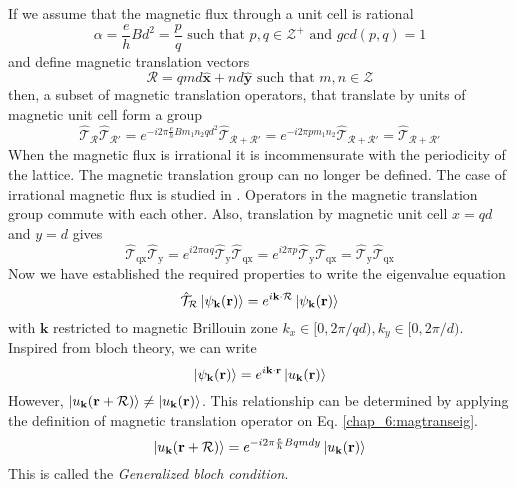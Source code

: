 If we assume that the magnetic flux through a unit cell is rational
\begin{equation}
 \alpha = \frac{e}{h}Bd^2 = \frac{p}{q} \text{ such that } p,q \in \mathcal{Z}^{+} \text{ and } gcd(p, q) = 1
\end{equation} and define magnetic translation vectors
\begin{equation}
 \mathcal{R} = qmd \hat{\mathbf{x}} + nd \hat{\mathbf{y}} \text{ such that } m,n \in \mathcal{Z}
\end{equation} then, a subset of magnetic translation operators, that translate by units of magnetic unit cell form a group
\begin{equation}
 \hat{\mathcal{T}}_{\mathcal{R}}\hat{\mathcal{T}}_{\mathcal{R}'} = e^{-i2\pi\frac{e}{h}Bm_{1}n_{2}qd^2}\hat{\mathcal{T}}_{\mathcal{R} + \mathcal{R}'} = e^{-i2\pi p m_{1}n_{2}}\hat{\mathcal{T}}_{\mathcal{R} + \mathcal{R}'} = \hat{\mathcal{T}}_{\mathcal{R} + \mathcal{R}'}
\end{equation} When the magnetic flux is irrational it is incommensurate with the periodicity of the lattice. The magnetic translation group can no longer be defined. The case of irrational magnetic flux is studied in \parencite{obermair1976bloch}. Operators in the magnetic translation group commute with each other. Also,
translation by magnetic unit cell $x=qd$ and $y=d$ gives 
\begin{equation}
 \hat{\mathcal{T}}_{\mathrm{qx}}\hat{\mathcal{T}}_{\mathrm{y}} = e^{i2\pi\alpha q}\hat{\mathcal{T}}_{\mathrm{y}}\hat{\mathcal{T}}_{\mathrm{qx}} = e^{i2\pi p}\hat{\mathcal{T}}_{\mathrm{y}}\hat{\mathcal{T}}_{\mathrm{qx}}=\hat{\mathcal{T}}_{\mathrm{y}}\hat{\mathcal{T}}_{\mathrm{qx}}
\end{equation}
Now we have established the required properties to write the eigenvalue equation
\begin{equation}
 \label{chap_6:magtranseig}\hat{\mathcal{T}}_{\mathcal{R}}\ket{\psi_{\mathbf{k}}(\mathbf{r})} = e^{i\mathbf{k}\cdot\mathcal{R}}\ket{\psi_{\mathbf{k}}(\mathbf{r})}
\end{equation} with $\mathbf{k}$ restricted to magnetic Brillouin zone $k_{x} \in [0, 2\pi/qd), k_{y} \in [0, 2\pi/d)$. Inspired from bloch theory,
we can write
\begin{equation}
 \ket{\psi_{\mathbf{k}}(\mathbf{r})} = e^{i\mathbf{k}\cdot\mathbf{r}}\ket{u_{\mathbf{k}}(\mathbf{r})}
\end{equation} However, $\ket{u_{\mathbf{k}}(\mathbf{r}+\mathcal{R})} \neq \ket{u_{\mathbf{k}}(\mathbf{r})}$. This relationship can be determined by applying the definition
of magnetic translation operator on Eq. \eqref{chap_6:magtranseig}.
\begin{equation}
 \ket{u_{\mathbf{k}}(\mathbf{r} + \mathcal{R})} = e^{-i2\pi\frac{e}{h}Bqmdy}\ket{u_{\mathbf{k}}(\mathbf{r})}
\end{equation} This is called the \emph{Generalized bloch condition}.

